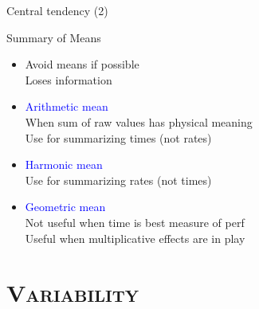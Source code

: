 \documentclass[xcolor=x11names,compress,8pt,
]{beamer}
\renewcommand{\(}{\begin{columns}}
\renewcommand{\)}{\end{columns}}
\newcommand{\<}[1]{\begin{column}{#1}}
\renewcommand{\>}{\end{column}}
\begin{document}
\begin{frame}{Central tendency (2)}
\begin{block}{Summary of Means}
\begin{itemize}
\item Avoid means if possible\\
Loses information
\item  \textcolor{blue}{Arithmetic mean}\\
 When sum of raw values has physical meaning\\
Use for summarizing times (not rates)
\item \textcolor{blue}{Harmonic mean}\\
Use for summarizing rates (not times)
\item \textcolor{blue}{Geometric mean}\\
 Not useful when time is best measure of perf\\
 Useful when multiplicative effects are in play
\end{itemize}
\end{block}
\end{frame}
\section[{\scshape Variability}]{{\scshape Variability}}
\end{document}
